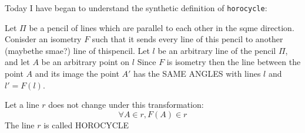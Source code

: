 Today I have began to understand the synthetic definition of 
{\tt horocycle}:


Let $\Pi$ be a pencil of lines which are parallel to each other
in the sqme direction.
 Conisder an isometry  $F$ such that it sends every line of this pencil
to another (maybethe smae?) line of thispencil.
 Let $l$ be an arbitrary line of the pencil $\Pi$,
and let $A$ be an arbitrary point on $l$
Since $F$ is isometry then the line between the point $A$
and its image the point $A'$ has the SAME ANGLES with lines
   $l$ and $l'=F(l)$.

Let a line $r$ does not change under this transformation: 
   $$
\forall A\in r, F(A)\in r
   $$
The line $r$ is called HOROCYCLE



\bye
